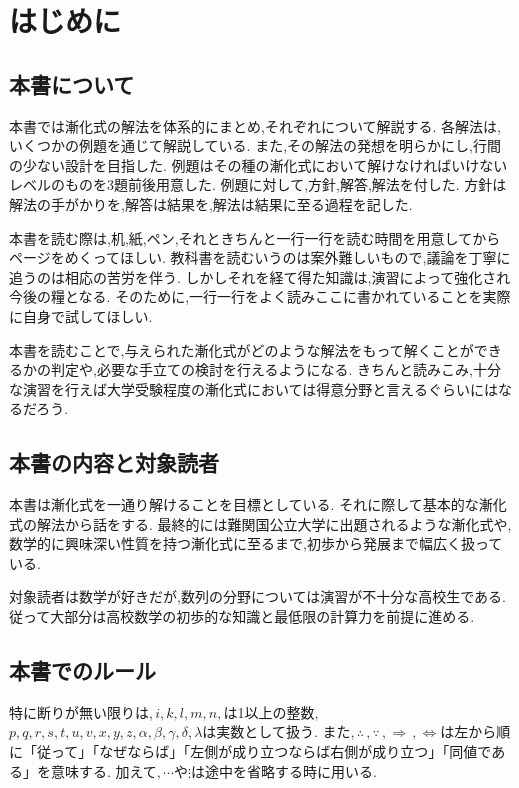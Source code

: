 
\section{はじめに}
\subsection{本書について}
本書では漸化式の解法を体系的にまとめ,それぞれについて解説する.
各解法は,いくつかの例題を通じて解説している.
また,その解法の発想を明らかにし,行間の少ない設計を目指した.
例題はその種の漸化式において解けなければいけないレベルのものを3題前後用意した.
例題に対して,方針,解答,解法を付した.
方針は解法の手がかりを,解答は結果を,解法は結果に至る過程を記した.

本書を読む際は,机,紙,ペン,それときちんと一行一行を読む時間を用意してからページをめくってほしい.
教科書を読むいうのは案外難しいもので,議論を丁寧に追うのは相応の苦労を伴う.
しかしそれを経て得た知識は,演習によって強化され今後の糧となる.
そのために,一行一行をよく読みここに書かれていることを実際に自身で試してほしい.

本書を読むことで,与えられた漸化式がどのような解法をもって解くことができるかの判定や,必要な手立ての検討を行えるようになる.
きちんと読みこみ,十分な演習を行えば大学受験程度の漸化式においては得意分野と言えるぐらいにはなるだろう.

\subsection{本書の内容と対象読者}
本書は漸化式を一通り解けることを目標としている.
それに際して基本的な漸化式の解法から話をする.
最終的には難関国公立大学に出題されるような漸化式や,数学的に興味深い性質を持つ漸化式に至るまで,初歩から発展まで幅広く扱っている.

対象読者は数学が好きだが,数列の分野については演習が不十分な高校生である.
従って大部分は高校数学の初歩的な知識と最低限の計算力を前提に進める.

\subsection{本書でのルール}
特に断りが無い限りは,\,$i,k,l,m,n,$は1以上の整数,\,$p,q,r,s,t,u,v,x,y,z,\alpha,\beta,\gamma,\delta,\lambda$は実数として扱う.
また,\,$\therefore\,,\because\,,\Rightarrow\,,\Leftrightarrow$は左から順に「従って」「なぜならば」「左側が成り立つならば右側が成り立つ」「同値である」を意味する.
加えて,\,$\cdots$や$\vdots$は途中を省略する時に用いる.
